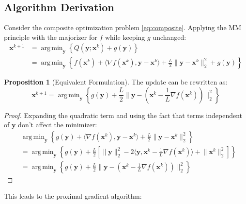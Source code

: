 \documentclass[12pt]{article}
\renewcommand{\vec}[1]{\mathbf{#1}}
\DeclareMathOperator{\argmin}{arg\,min}
\newcommand{\norm}[1]{\lVert #1 \rVert}
\theoremstyle{definition}
\newtheorem{proposition}[theorem]{Proposition}
\begin{document}
\subsection{Algorithm Derivation}

Consider the composite optimization problem \eqref{eq:composite}. Applying the MM principle with the majorizer for $f$ while keeping $g$ unchanged:
\begin{align}
    \vec{x}^{k+1} & = \argmin_{\vec{y}} \left\{ Q(\vec{y}; \vec{x}^k) + g(\vec{y}) \right\}                                                                                               \\
                  & = \argmin_{\vec{y}} \left\{ f(\vec{x}^k) + \langle \nabla f(\vec{x}^k), \vec{y} - \vec{x}^k \rangle + \frac{L}{2}\norm{\vec{y} - \vec{x}^k}_2^2 + g(\vec{y}) \right\}
\end{align}

\begin{proposition}[Equivalent Formulation]
    The update can be rewritten as:
    \begin{equation}
        \vec{x}^{k+1} = \argmin_{\vec{y}} \left\{ g(\vec{y}) + \frac{L}{2}\norm{\vec{y} - (\vec{x}^k - \frac{1}{L}\nabla f(\vec{x}^k))}_2^2 \right\}
    \end{equation}
\end{proposition}

\begin{proof}
    Expanding the quadratic term and using the fact that terms independent of $\vec{y}$ don't affect the minimizer:
    \begin{align}
         & \argmin_{\vec{y}} \left\{ g(\vec{y}) + \langle \nabla f(\vec{x}^k), \vec{y} - \vec{x}^k \rangle + \frac{L}{2}\norm{\vec{y} - \vec{x}^k}_2^2 \right\}                                         \\
         & = \argmin_{\vec{y}} \left\{ g(\vec{y}) + \frac{L}{2}\left[ \norm{\vec{y}}_2^2 - 2\langle \vec{y}, \vec{x}^k - \frac{1}{L}\nabla f(\vec{x}^k) \rangle + \norm{\vec{x}^k}_2^2 \right] \right\} \\
         & = \argmin_{\vec{y}} \left\{ g(\vec{y}) + \frac{L}{2}\norm{\vec{y} - (\vec{x}^k - \frac{1}{L}\nabla f(\vec{x}^k))}_2^2 \right\}
    \end{align}
\end{proof}

This leads to the proximal gradient algorithm:
\end{document}
